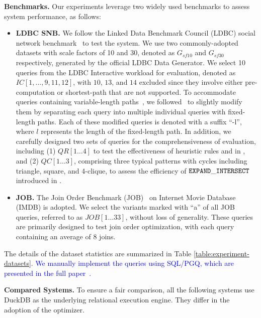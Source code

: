 \noindent\textbf{Benchmarks.} Our experiments leverage two widely used benchmarks to assess system performance, as follows:
\begin{itemize}
    \item \textbf{LDBC SNB.} We follow the Linked Data Benchmark Council (LDBC) social network benchmark~\cite{ldbc_snb} to test the system. We use two commonly-adopted datasets with scale factors of 10 and 30, denoted as $G_{sf10}$ and $G_{sf30}$ respectively, generated by the official LDBC Data Generator.
    We select 10 queries from the LDBC Interactive workload for evaluation, denoted as $IC[1, \ldots, 9, 11, 12]$, with $10$, $13$, and $14$ excluded since they involve either pre-computation or shortest-path that are not supported.
    To accommodate queries containing variable-length paths~\cite{graindb}, we followed~\cite{graindb} to slightly modify them by separating each query into multiple individual queries with fixed-length paths. Each of these modified queries is denoted with a suffix ``-l'', where $l$ represents the length of the fixed-length path. In addition, we carefully designed two sets of queries for the comprehensiveness of evaluation, including (1) $QR[1\ldots 4]$ to test the effectiveness of heuristic rules \filterrule and \joinfuserule in \name, and (2) $QC[1\ldots 3]$, comprising three typical patterns with cycles including triangle, square, and 4-clique, to assess the efficiency of $\texttt{EXPAND}\_\texttt{INTERSECT}$ introduced in .
    \item \textbf{JOB.} The Join Order Benchmark (JOB)~\cite{job_snb} on Internet Movie Database (IMDB) is adopted. We select the variants marked with ``a'' of all JOB queries, referred to as $JOB[1\ldots 33]$, without loss of generality. These queries are primarily designed to test join order optimization, with each query containing an average of $8$ joins.
\end{itemize}
The details of the dataset statistics are summarized in Table \ref{table:experiment-datasets}.
\textcolor{blue}{We manually implement the queries using SQL/PGQ, which are presented in the full paper~\cite{full-paper}.}

\noindent\textbf{Compared Systems. }
To ensure a fair comparison, all the following systems use DuckDB as the underlying relational execution engine. They differ in the adoption of the optimizer.


